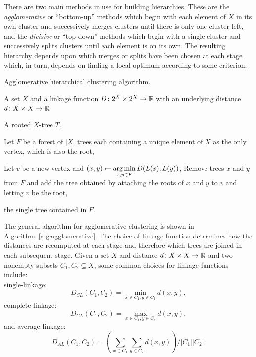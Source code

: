 There are two main methods in use for building hierarchies.  These are the
\textit{agglomerative} or ``bottom-up'' methods which begin with each element
of $X$ in its own cluster and successively merges clusters until there is only
one cluster left, and the \textit{divisive} or ``top-down'' methods which
begin with a single cluster and successively splits clusters until each
element is on its own.  The resulting hierarchy depends upon which merges or
splits have been chosen at each stage which, in turn, depends on finding a
local optimum according to some criterion.

\begin{algorithm}[h]
  \caption{Agglomerative hierarchical clustering algorithm.}
  \label{alg:agglomerative}

  \begin{algorithmic}
    \Require A set $X$ and a linkage function $D \colon 2^X \times 2^X \to {\mathbb R}$
    with an underlying distance $d \colon X \times X \to {\mathbb R}$.

    \Ensure  A rooted $X$-tree $T$.

    \State Let $F$ be a forest of $|X|$ trees each containing a unique element
    of $X$ as the only vertex, which is also the root,


       \State Let $v$ be a new vertex and $\displaystyle (x,y) \gets \operatorname*{arg\,min}_{x,y
         \in F} D(L(x),L(y))$,
       \State Remove trees $x$ and $y$ from $F$ and add the tree obtained by
         attaching the roots of $x$ and $y$ to $v$ and letting $v$ be the root,
    
    \EndWhile

    \State \Return the single tree contained in $F$.
    
  \end{algorithmic}
\end{algorithm}

The general algorithm for agglomerative clustering is shown in
Algorithm~\ref{alg:agglomerative}.  The choice of linkage function determines
how the distances are recomputed at each stage and therefore which trees are
joined in each subsequent stage.  Given a set $X$ and distance $d \colon X
\times X \to {\mathbb R}$ and two nonempty subsets $C_1,C_2 \subseteq X$, some common
choices for linkage functions include:\\
single-linkage:
\begin{equation*}
  \label{eq:slink}
  D_{SL}(C_1,C_2) = \min_{x \in C_1, y \in C_2} d(x,y),
\end{equation*}
complete-linkage:
\begin{equation*}
  \label{eq:clink}
  D_{CL}(C_1,C_2) = \max_{x \in C_1, y \in C_2} d(x,y),
\end{equation*}
and average-linkage:
\begin{equation*}
  \label{eq:alink}
  D_{AL}(C_1,C_2) = \left(\,\sum_{x \in C_1} \sum_{y \in C_2} d(x,y) \right) / |C_1| |C_2|.
\end{equation*}

